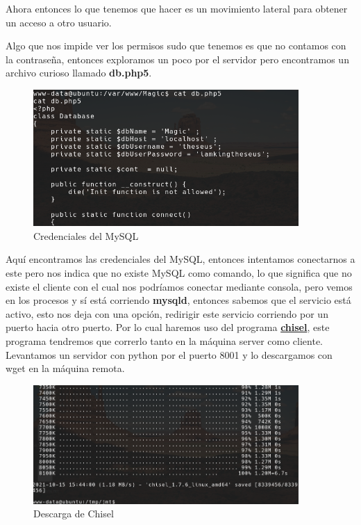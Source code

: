 \documentclass{article}
\begin{document}
Ahora entonces lo que tenemos que hacer es un movimiento lateral para obtener un acceso a otro usuario.

Algo que nos impide ver los permisos sudo que tenemos es que no contamos con la contraseña, entonces exploramos un poco por el servidor pero encontramos un archivo curioso llamado \textbf{db.php5}.

\begin{figure}[h!]
	\center 
	\includegraphics[width=0.9\textwidth]{images/magic/credenciales-mysql.png}
	\caption{Credenciales del MySQL}
\end{figure}

Aquí encontramos las credenciales del MySQL, entonces intentamos conectarnos a este pero nos indica que no existe MySQL como comando, lo que significa que no existe el cliente con el cual nos podríamos conectar mediante consola, pero vemos en los procesos y sí está corriendo \textbf{mysqld}, entonces sabemos que el servicio está activo, esto nos deja con una opción, redirigir este servicio corriendo por un puerto hacia otro puerto.
Por lo cual haremos uso del programa \textbf{\href{https://github.com/jpillora/chisel}{chisel}}, este programa tendremos que correrlo tanto en la máquina server como cliente.
Levantamos un servidor con python por el puerto 8001 y lo descargamos con wget en la máquina remota.

\begin{figure}[h!]
	\center 
	\includegraphics[width=0.9\textwidth]{images/magic/descargar-chisel.png}
	\caption{Descarga de Chisel}
\end{figure}
\end{document}
